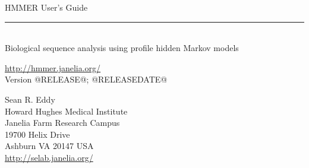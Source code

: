 \begin{titlepage}
{\Large

\vspace*{\fill}

\noindent
{\Huge {HMMER User's Guide}} \\ 
\rule[2pt]{\textwidth}{1pt} \\
\hspace*{\fill} {\large {Biological sequence analysis using
profile hidden Markov models} \\ }

\vspace*{\fill}

\begin{center}
\url{http://hmmer.janelia.org/}\\
Version @RELEASE@; @RELEASEDATE@ \\ 

\vspace*{\fill}

Sean R. Eddy\\
Howard Hughes Medical Institute\\
Janelia Farm Research Campus\\
19700 Helix Drive\\
Ashburn VA 20147 USA\\
\url{http://selab.janelia.org/} \\
\end{center}

\vspace*{\fill}

}
\end{titlepage}
